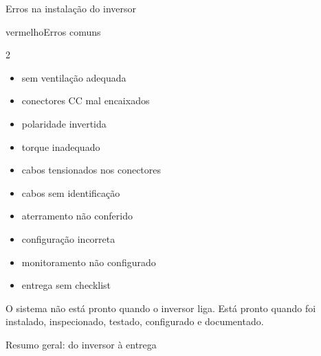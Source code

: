\documentclass[aspectratio=169,10pt,xcolor=table]{beamer}
\newcommand{\frase}[1]{\vspace{0.1em}\begin{destaque}#1\end{destaque}}
\begin{document}
\begin{frame}{Erros na instalação do inversor}
  \begin{card}{vermelho}{\faTimesCircle\enspace Erros comuns}
    \begin{multicols}{2}
    \begin{itemize}
      \item sem ventilação adequada
      \item conectores CC mal encaixados
      \item polaridade invertida
      \item torque inadequado
      \item cabos tensionados nos conectores
      \item cabos sem identificação
      \item aterramento não conferido
      \item configuração incorreta
      \item monitoramento não configurado
      \item entrega sem checklist
    \end{itemize}
    \end{multicols}
  \end{card}
  \frase{O sistema não está pronto quando o inversor liga. Está pronto quando foi instalado, inspecionado, testado, configurado e documentado.}
\end{frame}

\begin{frame}{Resumo geral: do inversor à entrega}
  \begin{center}
  \end{center}
\end{frame}

\end{document}
